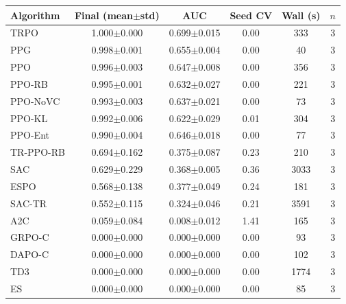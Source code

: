 \begin{tabular}{lccccc}
\toprule
Algorithm & Final (mean$\pm$std) & AUC & Seed CV & Wall (s) & $n$ \\
\midrule
TRPO & 1.000$\pm$0.000 & 0.699$\pm$0.015 & 0.00 & 333 & 3 \\
PPG & 0.998$\pm$0.001 & 0.655$\pm$0.004 & 0.00 & 40 & 3 \\
PPO & 0.996$\pm$0.003 & 0.647$\pm$0.008 & 0.00 & 356 & 3 \\
PPO-RB & 0.995$\pm$0.001 & 0.632$\pm$0.027 & 0.00 & 221 & 3 \\
PPO-NoVC & 0.993$\pm$0.003 & 0.637$\pm$0.021 & 0.00 & 73 & 3 \\
PPO-KL & 0.992$\pm$0.006 & 0.622$\pm$0.029 & 0.01 & 304 & 3 \\
PPO-Ent & 0.990$\pm$0.004 & 0.646$\pm$0.018 & 0.00 & 77 & 3 \\
TR-PPO-RB & 0.694$\pm$0.162 & 0.375$\pm$0.087 & 0.23 & 210 & 3 \\
SAC & 0.629$\pm$0.229 & 0.368$\pm$0.005 & 0.36 & 3033 & 3 \\
ESPO & 0.568$\pm$0.138 & 0.377$\pm$0.049 & 0.24 & 181 & 3 \\
SAC-TR & 0.552$\pm$0.115 & 0.324$\pm$0.046 & 0.21 & 3591 & 3 \\
A2C & 0.059$\pm$0.084 & 0.008$\pm$0.012 & 1.41 & 165 & 3 \\
GRPO-C & 0.000$\pm$0.000 & 0.000$\pm$0.000 & 0.00 & 93 & 3 \\
DAPO-C & 0.000$\pm$0.000 & 0.000$\pm$0.000 & 0.00 & 102 & 3 \\
TD3 & 0.000$\pm$0.000 & 0.000$\pm$0.000 & 0.00 & 1774 & 3 \\
ES & 0.000$\pm$0.000 & 0.000$\pm$0.000 & 0.00 & 85 & 3 \\
\bottomrule
\end{tabular}
